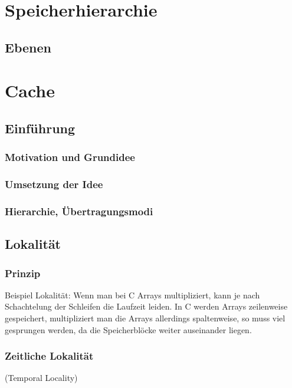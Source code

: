 \section{Speicherhierarchie}

\subsection{Ebenen}

\section{Cache}
\subsection{Einführung}
\subsubsection{Motivation und Grundidee}

\subsubsection{Umsetzung der Idee}

\subsubsection{Hierarchie, Übertragungsmodi}

\subsection{Lokalität}
\subsubsection{Prinzip}
Beispiel Lokalität: Wenn man bei C Arrays multipliziert, kann je nach Schachtelung der Schleifen die Laufzeit leiden. In C werden Arrays zeilenweise gespeichert, multipliziert man die Arrays allerdings spaltenweise, so muss viel gesprungen werden, da die Speicherblöcke weiter auseinander liegen.

\subsubsection{Zeitliche Lokalität}
(Temporal Locality)

